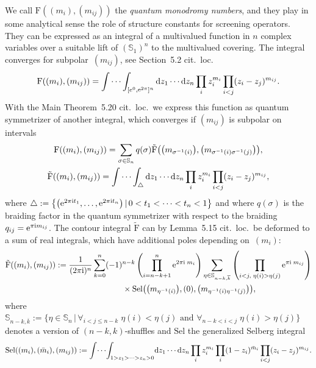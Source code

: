 \documentclass[10pt,a4paper]{amsart}
\numberwithin{equation}{section}
\renewcommand{\S}{\mathbb{S}}
\renewcommand{\i}{\mathrm{i}}
\newcommand{\Sel}{\mathrm{Sel}}
\newcommand{\Fp}{\mathrm{F}}
\newcommand{\rFp}{\tilde{\mathrm{F}}}
\begin{document}
We call $\Fp((m_i),(m_{ij}))$ the \emph{quantum monodromy numbers}, and they play in some analytical sense the role of structure constants for screening operators. They can be expressed as an integral of a multivalued function in $n$ complex variables over a suitable lift of $(\mathbb{S}_1)^n$ to the multivalued covering. The integral converges for subpolar~$(m_{ij})$, see Section~5.2 cit.~loc.
\begin{gather*}
\Fp((m_i),(m_{ij})) =\int\cdots\int_{[e^0,{\rm e}^{2\pi}]^n} {\rm d} z_1\cdots {\rm d} z_n \prod_i z_i^{m_i}\prod_{i<j}(z_i - z_j)^{m_{ij}}.
\end{gather*}
	With the Main Theorem~5.20 cit.~loc.~we express this function as quantum symmetrizer of another integral, which converges if $(m_{ij})$ is subpolar on intervals
\begin{gather*}
\Fp((m_i),(m_{ij})) =\sum_{\sigma\in \S_n} q(\sigma) \rFp\big(\big(m_{\sigma^{-1}(i)}\big),\big(m_{\sigma^{-1}(i)\sigma^{-1}(j)}\big)\big),\\
\rFp((m_i),(m_{ij}))
 =\int\cdots\int_{\triangle} {\rm d} z_1\cdots {\rm d} z_n \prod_i z_i^{m_i}\prod_{i<j}(z_i - z_j)^{m_{ij}},
\end{gather*}
where $\triangle:=\big\{\big({\rm e}^{2\pi\i t_1},\dots,{\rm e}^{2\pi\i t_n}\big) \,|\, 0<t_1<\cdots <t_n<1\big\}$ and where $q(\sigma)$ is the braiding factor in the quantum symmetrizer with respect to the braiding $q_{ij}={\rm e}^{\pi\i m_{ij}}$. The contour integral $\rFp$ can by Lemma~5.15 cit.~loc.~be deformed to a sum of real integrals, which have additional poles depending on~$(m_i)$:
\begin{gather*}
\rFp((m_i),(m_{ij}))
 :=\frac{1}{(2\pi\i)^n}\sum_{k=0}^n (-1)^{n-k}\left(\prod_{i=n-k+1}^n {\rm e}^{2\pi\i\;m_i}\right)\sum_{\eta\in\S_{n-k,\overline{k}}}\left(\prod_{i<j,\;\eta(i)>\eta(j)}{\rm e}^{\pi\i\;m_{ij}}\right)\\
 \hphantom{\rFp((m_i),(m_{ij})):= }{}
 \times
\Sel\big(\big(m_{\eta^{-1}(i)}\big),(0),\big(m_{\eta^{-1}(i)\eta^{-1}(j)}\big)\big),
\end{gather*}
where $\mathbb{S}_{n-k,\overline{k}}:=\{\eta\in \mathbb{S}_n \,|\, \forall_{i<j\leq n-k}\;\eta(i)<\eta(j)\text{ and } \forall_{n-k<i<j}\;\eta(i)>\eta(j)\}$ denotes a version of $(n-k,k)$-shuffles and $\Sel$ the generalized Selberg integral
\begin{gather*}
\Sel((m_i),(\bar{m}_i),(m_{ij})):=\int\!\cdots\!\int_{1> z_1>\dots >z_{n}> 0}\! {\rm d}z_1\cdots {\rm d}z_{n}
\prod_i z_i^{m_i}\prod_i (1-z_i)^{\bar{m}_i}\prod_{i<j} (z_i-z_j)^{m_{ij}}.
\end{gather*}
\end{document}

